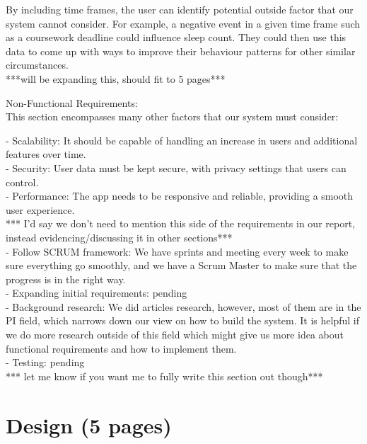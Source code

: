 \documentclass[12pt]{article}
\begin{document}
By including time frames, the user can identify potential outside factor that our system cannot consider. For example, a negative event in a given time frame such as a coursework deadline could influence sleep count. They could then use this data to come up with ways to improve their behaviour patterns for other similar circumstances.\\ 


***will be expanding this, should fit to 5 pages***

Non-Functional Requirements: \\ 

This section encompasses many other factors that our system must consider:

-    Scalability: It should be capable of handling an increase in users and additional features over time.\\

-    Security: User data must be kept secure, with privacy settings that users can control.\\

-    Performance: The app needs to be responsive and reliable, providing a smooth user experience.\\


*** I'd say we don't need to mention this side of the requirements in our report, instead evidencing/discussing it in other sections***\\

-    Follow SCRUM framework: We have sprints and meeting every week to make sure everything go smoothly, and we have a Scrum Master to make sure that the progress is in the right way.\\

-    Expanding initial requirements: pending\\

-    Background research: We did articles research, however, most of them are in the PI field, which narrows down our view on how to build the system. It is helpful if we do more research outside of this field which might give us more idea about functional requirements and how to implement them.\\

-       Testing: pending\\

*** let me know if you want me to fully write this section out though***



\section{Design (5 pages)}
\end{document}

